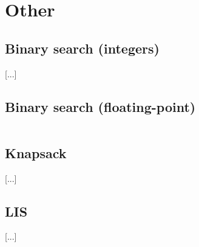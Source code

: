 \section{Other}
\subsection{Binary search (integers)}
[...]

\subsection{Binary search (floating-point)}
\inputminted[frame=single,framesep=3pt,breaklines=true,tabsize=2,linenos,label=O(log(N))]{c++}{other/binary-search-floats.cpp}

\subsection{Knapsack}
[...]

\subsection{LIS}
[...]
